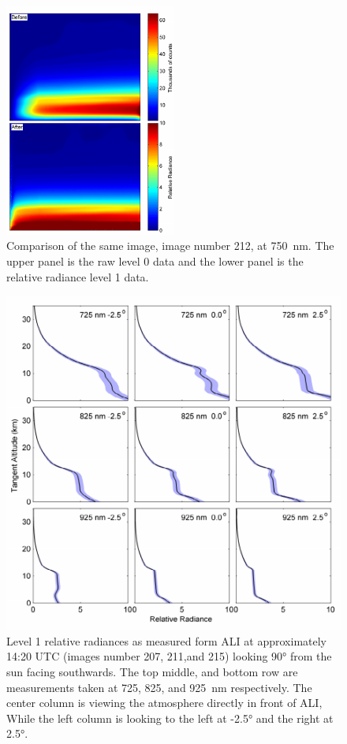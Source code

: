 \documentclass[12pt]{article}
\begin{document}
\newpage

\begin{figure}
\includegraphics[width=0.5\textwidth]{./Images/BeforeAfterImage.pdf}
    \caption{Comparison of the same image, image number 212, at 750~nm. The upper panel is the raw level 0 data and the lower panel is the relative radiance level 1 data.}
    \label{fig:BeforeAfterImages}
\end{figure}

\newpage

\begin{figure}
\includegraphics[width=1.0\textwidth]{./Images/AliRadiances.pdf}
    \caption{Level 1 relative radiances as measured form ALI at approximately 14:20 UTC (images number 207, 211,and 215) looking 90\si{\degree} from the sun facing southwards. The top middle, and bottom row are measurements taken at 725, 825, and 925~nm respectively. The center column is viewing the atmosphere directly in front of ALI, While the left column is looking to the left at -2.5\si{\degree} and the right at 2.5\si{\degree}. }
    \label{fig:AliRadiances}
\end{figure}
\end{document}
